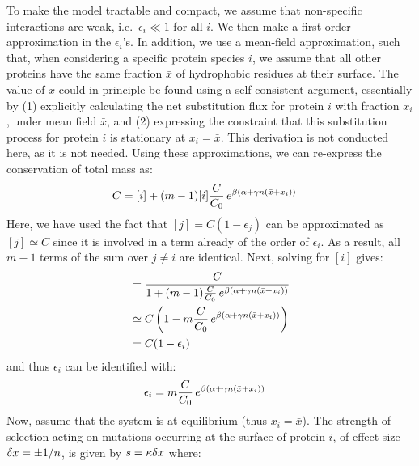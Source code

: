 \documentclass{article}
\begin{document}
To make the model tractable and compact, we assume that non-specific interactions are weak, i.e.~$\epsilon_i \ll 1$ for all $i$.
We then make a first-order approximation in the $\epsilon_i$'s.
In addition, we use a mean-field approximation, such that, when considering a specific protein species $i$, we assume that all other proteins have the same fraction $\bar x$ of hydrophobic residues at their surface.
The value of $\bar x$ could in principle be found using a self-consistent argument, essentially by (1) explicitly calculating the net {substitution} flux for protein $i$ with fraction $x_i$, under mean field $\bar x$, and (2) expressing the constraint that this {substitution} process for protein $i$ is stationary at $x_i = \bar x$.
This derivation is not conducted here, as it is not needed.
Using these approximations, we can re-express the conservation of total mass as:
\begin{align}
    C & = [i] + (m-1) [i] \frac{C}{C_0} \, e^{\beta (\alpha + \gamma n (\bar x + x_i))}
\end{align}
Here, we have used the fact that $[j] = C(1 - \epsilon_j)$ can be approximated as $[j] \simeq C$ since it is involved in a term already of the order of $\epsilon_i$. As a result, all $m-1$ terms of the sum over $j\neq i$ are identical.
Next, solving for $[i]$ gives:
\begin{align}
[i]
    & = \frac{C} {1 + (m-1) \frac{C}{C_0} \, e^{\beta (\DeltaGmin + \DeltaDeltaG \NbrSites (\bar x + x_i))}}
    \\ & \simeq C \left( 1 - m \frac{C}{C_0} \, e^{\beta (\DeltaGmin + \DeltaDeltaG \NbrSites (\bar x + x_i))} \right)
    \\ & =
    C (1 - \epsilon_i)
\end{align}
and thus $\epsilon_i$ can be identified with:
\begin{align}
    \epsilon_i  & = m \frac{C}{C_0} \, e^{\beta (\alpha +\gamma n (\bar x + x_i))}
\end{align}
Now, assume that the system is at equilibrium (thus $x_i = \bar x$).
The strength of selection acting on mutations occurring at the surface of protein $i$, of effect size $\delta x = \pm 1/n$, is given by $s = \kappa \delta x$ where:
\end{document}
